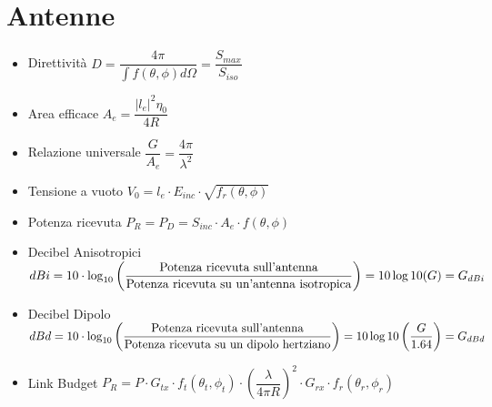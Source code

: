 \documentclass{article}
\begin{document}
\section{Antenne}
\begin{itemize}
	\item Direttività \( \displaystyle D = \dfrac{4 \pi}{\int{f(\theta, \phi) d \Omega}} = \dfrac{S_{max}}{S_{iso}} \)	
	\item Area efficace \( \displaystyle A_e = \dfrac{|l_e| ^ 2 \eta_0}{4 R} \)
	\item Relazione universale \( \dfrac{G}{A_e} = \dfrac{4 \pi}{\lambda^2} \)
	\item Tensione a vuoto \( V_0 = l_e \cdot E_{inc} \cdot \sqrt{f_r(\theta, \phi)} \)
	\item Potenza ricevuta \(P_R = P_D = S_{inc} \cdot A_e \cdot  f(\theta, \phi) \)
	\item Decibel Anisotropici \(dBi = 10 \cdot \log_{10} \left( \dfrac{\textnormal{Potenza ricevuta sull'antenna}}{\textnormal{Potenza ricevuta su un'antenna isotropica}} \right) = 10 \log{10} (G) = G_{dBi}\)
	\item Decibel Dipolo  \(dBd = 10 \cdot \log_{10} \left( \dfrac{\textnormal{Potenza ricevuta sull'antenna}}{\textnormal{Potenza ricevuta su un dipolo hertziano}} \right) = 10 \log{10} \left( \dfrac{G}{1.64} \right) = G_{dBd}\)
	\item Link Budget \(P_R = P \cdot G_{tx} \cdot f_t (\theta_t, \phi_t) \cdot \left( \dfrac{\lambda}{4 \pi R} \right) ^ 2 \cdot G_{rx} \cdot f_r (\theta_r, \phi_r) \)
\end{itemize}
\end{document}
